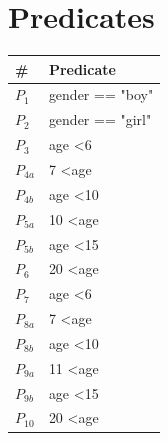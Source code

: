 \documentclass[11pt, oneside]{article}   	%
\begin{document}
\section{Predicates}
\begin{table}[!htb]
\centering
\begin{tabular}{|l|l|}
\hline
\#  & Predicate        \\ \hline
$P_1$  & gender == "boy"  \\ \hline
$P_2$  & gender == "girl" \\ \hline
$P_3$  & age \textless 6  \\ \hline
$P_{4a}$ & 7 \textless age  \\ \hline
$P_{4b}$ & age \textless 10 \\ \hline
$P_{5a}$ & 10 \textless age \\ \hline
$P_{5b}$ & age \textless 15 \\ \hline
$P_6$  & 20 \textless age \\ \hline
$P_7$  & age \textless 6  \\ \hline
$P_{8a}$ & 7 \textless age  \\ \hline
$P_{8b}$ & age \textless 10 \\ \hline
$P_{9a}$ & 11 \textless age \\ \hline
$P_{9b}$ & age \textless 15 \\ \hline
$P_{10}$ & 20 \textless age \\ \hline
\end{tabular}
\end{table}
\end{document}
